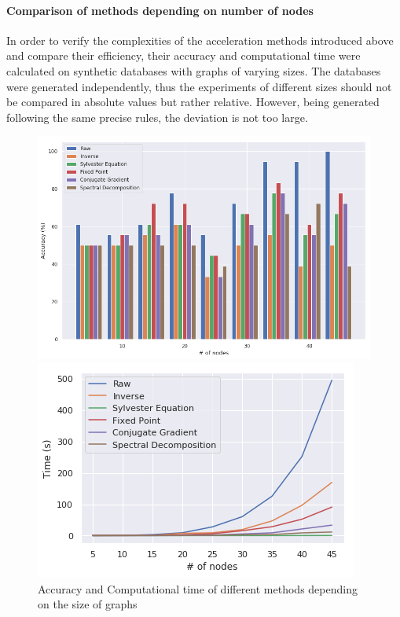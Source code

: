\documentclass{article}
\theoremstyle{definition}
\begin{document}
\paragraph{Comparison of methods depending on number of nodes}
In order to verify the complexities of the acceleration methods introduced above and compare their efficiency, their accuracy and computational time were calculated on synthetic databases with graphs of varying sizes. The databases were generated independently, thus the experiments of different sizes should not be compared in absolute values but rather relative. However, being generated following the same precise rules, the deviation is not too large.
\begin{figure}[!htb]
	\begin{multicols}{2}
		\includegraphics[width=\linewidth]{data/nb_nodes/acc.png}\par
		\includegraphics[width=\linewidth]{data/nb_nodes/time.png}\par
	\end{multicols}
\caption{Accuracy and Computational time of different methods depending on the size of graphs}
\end{figure}
\end{document}
